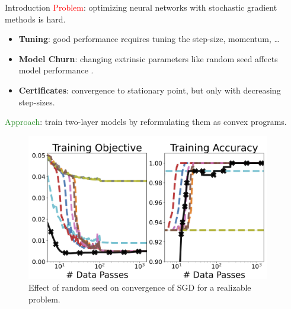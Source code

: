 \documentclass[12pt, usenames, dvipsnames]{beamer}
\newlength{\sepwidth}
\newlength{\colwidth}
\newcommand{\separatorcolumn}{\begin{column}{\sepwidth}\end{column}}
\newcommand{\red}[1]{\textcolor{Red}{#1}}
\newcommand{\green}[1]{\textcolor{ForestGreen}{#1}}
\begin{document}
\begin{frame}[t]
	\begin{columns}[t]
		\separatorcolumn

		\begin{column}{\colwidth}
			\vspace{-1.5em}
			\begin{block}{Introduction}
				\large
				{\large \red{Problem}: optimizing neural networks with stochastic gradient methods is hard.}

				\begin{itemize}
					\item \textbf{Tuning}: good performance requires tuning the step-size, momentum, \ldots

					\item \textbf{Model Churn}: changing extrinsic parameters like random seed affects model performance \citep{henderson2018deep}.

					\item \textbf{Certificates}: convergence to stationary point, but only with decreasing step-sizes.
				\end{itemize}

				{\large \green{Approach}: train two-layer models by reformulating them as convex programs.}
				\vspace{-0.25em}

				\begin{figure}[]
					\centering
					\includegraphics[width=.9\textwidth]{assets/synthetic_classification.png}
					\caption{Effect of random seed on convergence of SGD for a realizable problem.}
					\vspace{-1em}
					\label{fig:synthetic_classification}
				\end{figure}

			\end{block}


\end{column}
\end{columns}
\end{frame}
\end{document}
